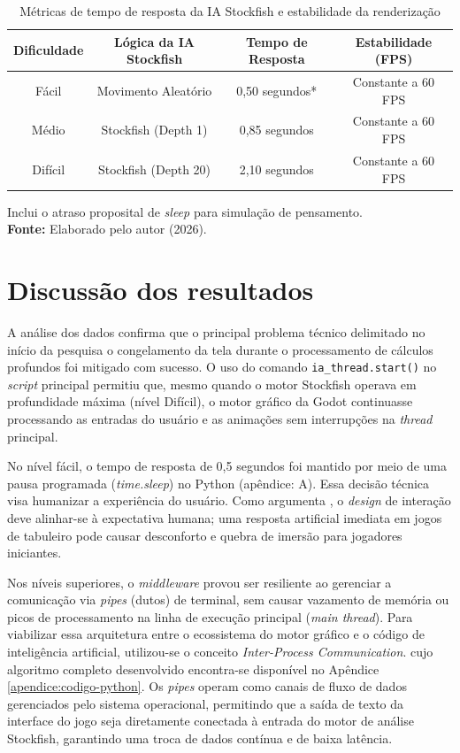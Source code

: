 \begin{table}[htb]
	\centering
	\caption{Métricas de tempo de resposta da IA Stockfish e estabilidade da renderização}
	\label{tabela:resultados-desempenho}
	\begin{tabular}{|c|c|c|c|}
		\hline
		\textbf{Dificuldade} & \textbf{Lógica da IA Stockfish} & \textbf{Tempo de Resposta} & \textbf{Estabilidade (FPS)} \\ \hline
		Fácil & Movimento Aleatório & 0,50 segundos* & Constante a 60 FPS \\ \hline
		Médio & Stockfish (Depth 1) & 0,85 segundos & Constante a 60 FPS \\ \hline
		Difícil & Stockfish (Depth 20) & 2,10 segundos & Constante a 60 FPS \\ \hline
	\end{tabular}
	
	\vspace{5pt}
	{\small *Inclui o atraso proposital de \textit{sleep} para simulação de pensamento. \\
		\textbf{Fonte:} Elaborado pelo autor (2026).}
\end{table}

\section{Discussão dos resultados}
\label{secao:discussao}

A análise dos dados confirma que o principal problema técnico delimitado no início da pesquisa o congelamento da tela durante o processamento de cálculos profundos foi mitigado com sucesso. O uso do comando \texttt{ia\_thread.start()} no \textit{script} principal \cite{RoyalLegacy2026} permitiu que, mesmo quando o motor Stockfish operava em profundidade máxima (nível Difícil), o motor gráfico da Godot continuasse processando as entradas do usuário e as animações sem interrupções na \textit{thread} principal.

No nível fácil, o tempo de resposta de 0,5 segundos foi mantido por meio de uma pausa programada (\textit{time.sleep}) no Python (apêndice: A). Essa decisão técnica visa humanizar a experiência do usuário. Como argumenta , o \textit{design} de interação deve alinhar-se à expectativa humana; uma resposta artificial imediata em jogos de tabuleiro pode causar desconforto e quebra de imersão para jogadores iniciantes.

Nos níveis superiores, o \textit{middleware} provou ser resiliente ao gerenciar a comunicação via \textit{pipes} (dutos) de terminal, sem causar vazamento de memória ou picos de processamento na linha de execução principal (\textit{main thread}). Para viabilizar essa arquitetura entre o ecossistema do motor gráfico e o código de inteligência artificial, utilizou-se o conceito \textit{Inter-Process Communication}. cujo algoritmo completo desenvolvido encontra-se disponível no Apêndice \ref{apendice:codigo-python}. Os \textit{pipes} operam como canais de fluxo de dados gerenciados pelo sistema operacional, permitindo que a saída de texto da interface do jogo seja diretamente conectada à entrada do motor de análise Stockfish, garantindo uma troca de dados contínua e de baixa latência.

